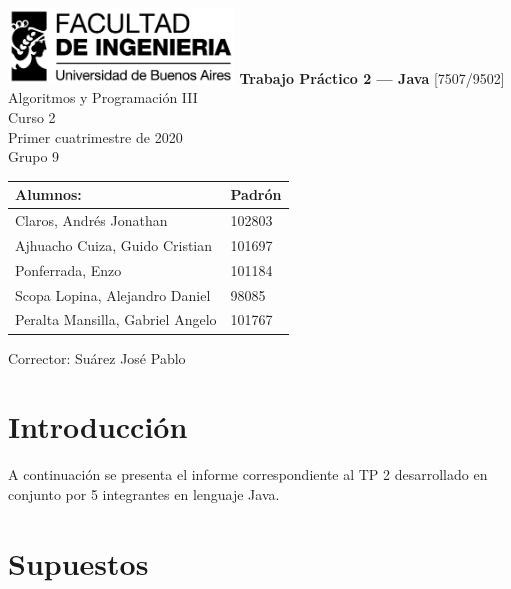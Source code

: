 \documentclass[titlepage,a4paper]{article}
\begin{document}
\begin{titlepage} %
	\hfill\includegraphics[width=6cm]{logofiuba.jpg}
    \centering
    \vfill
    \Huge \textbf{Trabajo Práctico 2  — Java}
    \vskip2cm
    \Large [7507/9502] Algoritmos y Programación III\\
    Curso 2 \\ %
    Primer cuatrimestre de 2020 \\
    Grupo 9
    
    \vfill

    \begin{tabular}{ | l | l | } %
      \hline
        Alumnos: & Padrón  \\ \hline
        Claros, Andrés Jonathan & 102803  \\ \hline
        Ajhuacho Cuiza, Guido Cristian & 101697  \\ \hline
        Ponferrada,	Enzo & 101184  \\ \hline
        Scopa Lopina, Alejandro Daniel & 98085  \\ \hline
        Peralta Mansilla, Gabriel Angelo & 101767  \\ \hline
      
  	\end{tabular}
    
    \vfill
    Corrector: Suárez José Pablo
    \vfill
    
    \vfill
    \vfill
\end{titlepage}

\tableofcontents %
\newpage

\section{Introducción}\label{sec:intro}
A continuación se presenta el informe correspondiente al TP 2 desarrollado en conjunto por 5 integrantes en lenguaje Java.


\section{Supuestos}\label{sec:supuestos}
\end{document}
